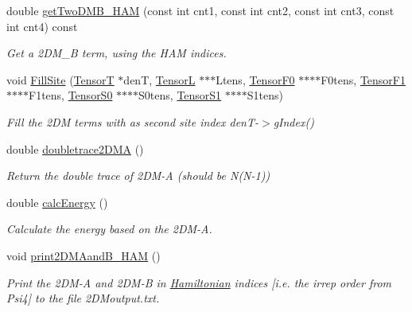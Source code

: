 \begin{DoxyCompactItemize}
double \hyperlink{classCheMPS2_1_1TwoDM_adbf8c64ef9c9f687c51fded841961e88}{get\-Two\-D\-M\-B\-\_\-\-H\-A\-M} (const int cnt1, const int cnt2, const int cnt3, const int cnt4) const 
\begin{DoxyCompactList}\small\item\em Get a 2\-D\-M\-\_\-\-B term, using the H\-A\-M indices. \end{DoxyCompactList}\item 
void \hyperlink{classCheMPS2_1_1TwoDM_a5c5bf12b31aa9cb4b0b31bd53dad1ed3}{Fill\-Site} (\hyperlink{classCheMPS2_1_1TensorT}{Tensor\-T} $\ast$den\-T, \hyperlink{classCheMPS2_1_1TensorL}{Tensor\-L} $\ast$$\ast$$\ast$Ltens, \hyperlink{classCheMPS2_1_1TensorF0}{Tensor\-F0} $\ast$$\ast$$\ast$$\ast$F0tens, \hyperlink{classCheMPS2_1_1TensorF1}{Tensor\-F1} $\ast$$\ast$$\ast$$\ast$F1tens, \hyperlink{classCheMPS2_1_1TensorS0}{Tensor\-S0} $\ast$$\ast$$\ast$$\ast$S0tens, \hyperlink{classCheMPS2_1_1TensorS1}{Tensor\-S1} $\ast$$\ast$$\ast$$\ast$S1tens)
\begin{DoxyCompactList}\small\item\em Fill the 2\-D\-M terms with as second site index den\-T-\/$>$g\-Index() \end{DoxyCompactList}\item 
double \hyperlink{classCheMPS2_1_1TwoDM_a3970c2fccf52e6e653e2866fabcd3d04}{doubletrace2\-D\-M\-A} ()
\begin{DoxyCompactList}\small\item\em Return the double trace of 2\-D\-M-\/\-A (should be N(N-\/1)) \end{DoxyCompactList}\item 
double \hyperlink{classCheMPS2_1_1TwoDM_a1e1714c5e2d9cd7bf756ea9263f4711d}{calc\-Energy} ()
\begin{DoxyCompactList}\small\item\em Calculate the energy based on the 2\-D\-M-\/\-A. \end{DoxyCompactList}\item 
\hypertarget{classCheMPS2_1_1TwoDM_a7db1712597ef8e49ce8afa3a25d64a63}{void \hyperlink{classCheMPS2_1_1TwoDM_a7db1712597ef8e49ce8afa3a25d64a63}{print2\-D\-M\-Aand\-B\-\_\-\-H\-A\-M} ()}\label{classCheMPS2_1_1TwoDM_a7db1712597ef8e49ce8afa3a25d64a63}

\begin{DoxyCompactList}\small\item\em Print the 2\-D\-M-\/\-A and 2\-D\-M-\/\-B in \hyperlink{classCheMPS2_1_1Hamiltonian}{Hamiltonian} indices \mbox{[}i.\-e. the irrep order from Psi4\mbox{]} to the file 2\-D\-Moutput.\-txt. \end{DoxyCompactList}\end{DoxyCompactItemize}


